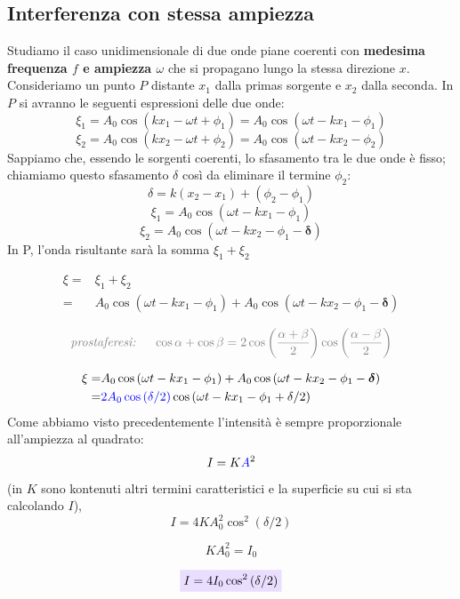 \documentclass[x11names]{report}
\newcommand{\viola}[1]{\colorbox{yred}{$\displaystyle #1$}}
\begin{document}
	\subsection{Interferenza con stessa ampiezza}
	Studiamo il caso unidimensionale di due onde piane coerenti con \textbf{medesima frequenza \(f\) e ampiezza \(\omega\)} che si propagano lungo la stessa direzione \(x\). Consideriamo un punto \(P\) distante \(x_1\) dalla primas sorgente e  \(x_2\) dalla seconda. In \(P\) si avranno le seguenti espressioni delle due onde:
	\[ 
	\xi_1 = A_0\cos\left(kx_1 -\omega t + \phi_1\right) = A_0\cos\left(\omega t - kx_1 - \phi_1\right)
	\]
	\[ 
	\xi_2 = A_0\cos\left(kx_2 -\omega t + \phi_2\right) = A_0\cos\left(\omega t - kx_2 - \phi_2\right)
	\]
	Sappiamo che, essendo le sorgenti coerenti, lo sfasamento tra le due onde è fisso; chiamiamo questo sfasamento \(\delta\) così da eliminare il termine \(\phi_2\):
	\[ 
	\boxed{\delta = k(x_2 - x_1) + (\phi_2-\phi_1)}
	\]
	\[ 
	\xi_1 = A_0\cos\left(\omega t - kx_1 - \phi_1\right)
	\]
	\[ 
	\xi_2 = A_0\cos\left(\omega t - kx_2 - \phi_1 - \boldsymbol{\delta}\right)
	\] 
	In P, l'onda risultante sarà la somma \(\xi _1 + \xi _2\)
	
	\begin{align*}
		\xi =& \xi_1 + \xi _2 \\
		=&  A_0\cos\left(\omega t - kx_1 - \phi_1\right) + A_0\cos\left(\omega t - kx_2 - \phi_1 - \boldsymbol{\delta}\right)
	\end{align*}
	
	\[
	\textcolor{gray}{\textit{prostaferesi: } \quad \cos\alpha + \cos\beta = 2\cos\left(\frac{\alpha + \beta}{2}\right)\cos\left(\frac{\alpha - \beta}{2}\right)}
	\]
	
	\begin{align*}
		\xi =& A_0\cos\left(\omega t - kx_1 - \phi_1\right) + A_0\cos\left(\omega t - kx_2 - \phi_1 - \boldsymbol{\delta}\right)\\
		=& \textcolor{blue}{2A_0\cos\left(\delta/2\right)}\cos\left(\omega t - kx_1 - \phi_1+\delta/2\right)
	\end{align*}
	Come abbiamo visto precedentemente l'intensità è sempre proporzionale all'ampiezza al quadrato:
	\[ 
	I = K\textcolor{blue}{A}^2
	\]
	(in \(K\) sono kontenuti altri termini caratteristici e la superficie su cui si sta calcolando \(I\)),
	\[ 
	I = 4KA_0^2 \cos^2\left(\delta/2\right)
	\]
	
	\[ 
	\boxed{KA_0^2 = I_0}
	\]
	
	\begin{equation}
		\viola{I = 4I_0 \cos^2\left(\delta/2\right)}
	\end{equation} \\
	
\end{document}
